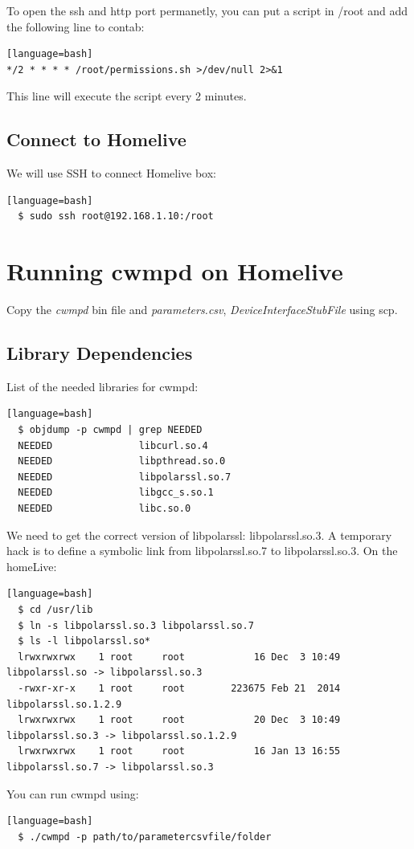 To open the ssh and http port permanetly, you can put a script in /root and add the following line to contab:
\begin{lstlisting}[style=DOS][language=bash]
*/2 * * * * /root/permissions.sh >/dev/null 2>&1
\end{lstlisting}
This line will execute the script every 2 minutes.


\subsection{Connect to Homelive}
We will use SSH to connect Homelive box:
\begin{lstlisting}[style=DOS][language=bash]
  $ sudo ssh root@192.168.1.10:/root
\end{lstlisting}
\section{Running cwmpd on Homelive}
Copy the \textit{cwmpd} bin file and \textit{parameters.csv}, \textit{DeviceInterfaceStubFile} using scp.

\subsection{Library Dependencies}
List of the needed libraries for cwmpd:
\begin{lstlisting}[style=DOS][language=bash]
  $ objdump -p cwmpd | grep NEEDED
  NEEDED               libcurl.so.4
  NEEDED               libpthread.so.0
  NEEDED               libpolarssl.so.7
  NEEDED               libgcc_s.so.1
  NEEDED               libc.so.0
\end{lstlisting}

We need to get the correct version of libpolarssl: libpolarssl.so.3. A temporary hack is to define a symbolic link from libpolarssl.so.7 to libpolarssl.so.3. On the homeLive:
\begin{lstlisting}[style=DOS][language=bash]
  $ cd /usr/lib
  $ ln -s libpolarssl.so.3 libpolarssl.so.7
  $ ls -l libpolarssl.so*
  lrwxrwxrwx    1 root     root            16 Dec  3 10:49 libpolarssl.so -> libpolarssl.so.3
  -rwxr-xr-x    1 root     root        223675 Feb 21  2014 libpolarssl.so.1.2.9
  lrwxrwxrwx    1 root     root            20 Dec  3 10:49 libpolarssl.so.3 -> libpolarssl.so.1.2.9
  lrwxrwxrwx    1 root     root            16 Jan 13 16:55 libpolarssl.so.7 -> libpolarssl.so.3
\end{lstlisting}


You can run cwmpd using:
\begin{lstlisting}[style=DOS][language=bash]
  $ ./cwmpd -p path/to/parametercsvfile/folder
\end{lstlisting}
